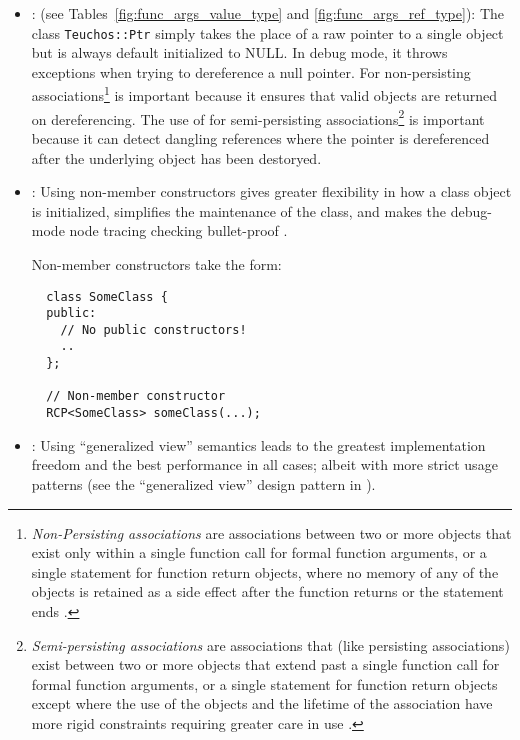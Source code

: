 \begin{itemize}
{}\item\GCGTeuchosPtr: (see Tables~\ref{fig:func_args_value_type} and
{}\ref{fig:func_args_ref_type}): The class {}\texttt{Teuchos\-::Ptr}
simply takes the place of a raw pointer to a single object but is
always default initialized to NULL.  In debug mode, it throws
exceptions when trying to dereference a null pointer.  For
non-persisting associations\footnote{\textit{Non-Persisting
associations} are associations between two or more objects that exist
only within a single function call for formal function arguments, or a
single statement for function return objects, where no memory of any
of the objects is retained as a side effect after the function returns
or the statement ends {}\cite{RefCountPtrBeginnersGuide,
TeuchosMemoryManagementGuide}.} {} is important
because it ensures that valid objects are returned on dereferencing.
The use of {} for semi-persisting
associations\footnote{\textit{Semi-persisting associations} are
associations that (like persisting associations) exist between two or
more objects that extend past a single function call for formal
function arguments, or a single statement for function return objects
except where the use of the objects and the lifetime of the
association have more rigid constraints requiring greater care in use
{}\cite{RefCountPtrBeginnersGuide, TeuchosMemoryManagementGuide}.} is
important because it can detect dangling references where the pointer
is dereferenced after the underlying object has been destoryed.


{}\item\GCGNonmemberConstructors: Using non-member constructors gives
greater flexibility in how a class object is initialized, simplifies
the maintenance of the class, and makes the debug-mode node tracing
checking bullet-proof {}\cite{TeuchosMemoryManagementGuide}.

Non-member constructors take the form:

{\small\begin{verbatim}
  class SomeClass {
  public:
    // No public constructors!
    ..
  };

  // Non-member constructor
  RCP<SomeClass> someClass(...);
\end{verbatim}}


{}\item\GCGGeneralizedViews: Using ``generalized view'' semantics
leads to the greatest implementation freedom and the best performance
in all cases; albeit with more strict usage patterns (see the
``generalized view'' design pattern in
{}\cite{TeuchosMemoryManagementGuide}).


\end{itemize}
